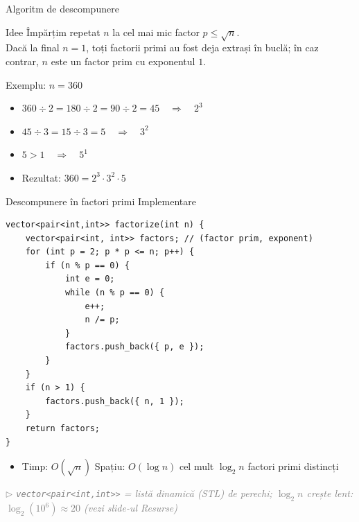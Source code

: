 ﻿\documentclass{beamer}
\newcommand{\beginnote}[1]{%
  \vfill
  {\footnotesize\textcolor{gray}{\textit{$\triangleright$ #1 (vezi slide-ul \emph{Resurse})}}}%
}
\begin{document}
\begin{frame}{Algoritm de descompunere}
  \begin{block}{Idee}
    Împărțim repetat $n$ la cel mai mic factor $p \leq \sqrt{n}$. \\
    Dacă la final $n = 1$, toți factorii primi au fost deja extrași în buclă; în caz contrar, $n$ este un factor prim cu exponentul $1$. \\
  \end{block}
  \bigskip
  Exemplu: $n = 360$
  \begin{itemize}
    \item $360 \div 2 = 180 \div 2 = 90 \div 2 = 45 \quad\Rightarrow\quad 2^3$
    \item $45 \div 3 = 15 \div 3 = 5 \quad\Rightarrow\quad 3^2$
    \item $5 > 1 \quad\Rightarrow\quad 5^1$
    \item Rezultat: $360 = 2^3 \cdot 3^2 \cdot 5$
  \end{itemize}
\end{frame}

\begin{frame}{Descompunere în factori primi \textemdash{} Implementare}
  \begin{lstlisting}
vector<pair<int,int>> factorize(int n) {
    vector<pair<int, int>> factors; // (factor prim, exponent)
    for (int p = 2; p * p <= n; p++) {
        if (n % p == 0) {
            int e = 0;
            while (n % p == 0) {
                e++;
                n /= p;
            }
            factors.push_back({ p, e });
        }
    }
    if (n > 1) {
        factors.push_back({ n, 1 });
    }
    return factors;
}
  \end{lstlisting}
  \begin{itemize}
    \item Timp: $O(\sqrt{n})$ \quad Spațiu: $O(\log n)$ \textemdash{} cel mult $\log_2 n$ factori primi distincți
  \end{itemize}
  \beginnote{\lstinline|vector<pair<int,int>>| = listă dinamică (STL) de perechi; $\log_2 n$ crește lent: $\log_2(10^6)\approx 20$}
\end{frame}
\end{document}
